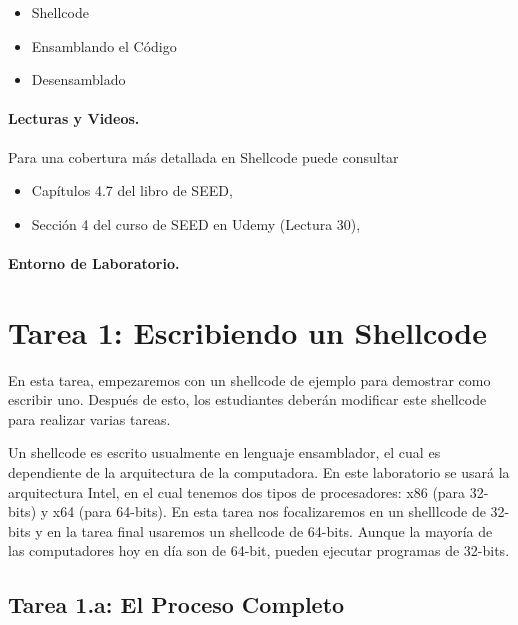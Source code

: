 \begin{itemize}[noitemsep]
\item Shellcode
\item Ensamblando el Código
\item Desensamblado 
\end{itemize}


\paragraph{Lecturas y Videos.}
Para una cobertura más detallada en Shellcode puede consultar

\begin{itemize}
\item Capítulos 4.7 del libro de SEED, \seedbook
\item Sección 4 del curso de SEED en Udemy (Lectura 30), \seedcsvideo
\end{itemize}


\paragraph{Entorno de Laboratorio.} \seedenvironmentC


\section{Tarea 1: Escribiendo un Shellcode}

En esta tarea, empezaremos con un shellcode de ejemplo para demostrar como escribir uno. Después de esto, los estudiantes deberán modificar este shellcode para realizar varias tareas.

Un shellcode es escrito usualmente en lenguaje ensamblador, el cual es dependiente de la arquitectura de la computadora. En este laboratorio se usará la arquitectura Intel, en el cual tenemos dos tipos de procesadores:
x86 (para 32-bits) y x64 (para 64-bits). En esta tarea nos focalizaremos en un shelllcode de 32-bits y en la tarea final usaremos un shellcode de 64-bits.
Aunque la mayoría de las computadores hoy en día son de 64-bit, pueden ejecutar programas de 32-bits.


\subsection{Tarea 1.a: El Proceso Completo}

